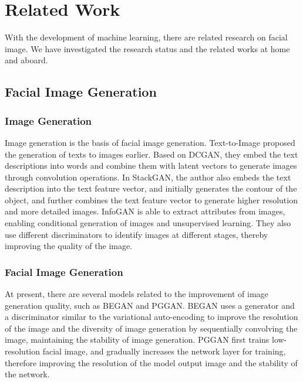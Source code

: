 \section{Related Work}


With the development of machine learning, there are related research on facial image.
We have investigated the research status and the related works at home and aboard.

\subsection{Facial Image Generation}

\subsubsection*{Image Generation}

Image generation is the basis of facial image generation.
Text-to-Image proposed the generation of texts to images earlier.
Based on DCGAN, they embed the text descriptions into words and combine them with latent vectors to generate images through convolution operations.
In StackGAN, the author also embeds the text description into the text feature vector,
    and initially generates the contour of the object,
    and further combines the text feature vector to generate higher resolution and more detailed images.
    InfoGAN is able to extract attributes from images, enabling conditional generation of images and unsupervised learning.
They also use different discriminators to identify images at different stages, thereby improving the quality of the image.


\subsubsection*{Facial Image Generation}

At present, there are several models related to the improvement of image generation quality,
    such as BEGAN and PGGAN.
BEGAN uses a generator and a discriminator similar to the variational auto-encoding to improve the resolution of the image and the diversity of image generation by sequentially convolving the image,
    maintaining the stability of image generation.
PGGAN first trains low-resolution facial image,
    and gradually increases the network layer for training,
    therefore improving the resolution of the model output image and the stability of the network.



